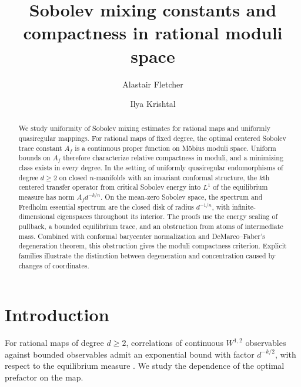 \documentclass[11pt,reqno]{amsart}
\theoremstyle{plain}
\theoremstyle{definition}
\theoremstyle{remark}
\numberwithin{equation}{section}
\begin{document}
\title{Sobolev mixing constants and compactness in rational moduli space}

\author[A. Fletcher]{Alastair Fletcher}
\address{Department of Mathematical Sciences, Northern Illinois University,
DeKalb, IL 60115, USA}

\author[I. Krishtal]{Ilya Krishtal}
\address{Department of Mathematical Sciences, Northern Illinois University,
DeKalb, IL 60115, USA}


\begin{abstract}
We study uniformity of Sobolev mixing estimates for rational maps and uniformly quasiregular mappings. For rational maps of fixed degree, the optimal centered Sobolev trace constant $A_f$ is a continuous proper function on M\"obius moduli space. Uniform bounds on $A_f$ therefore characterize relative compactness in moduli, and a minimizing class exists in every degree. In the setting of uniformly quasiregular endomorphisms of degree $d\ge2$ on closed $n$-manifolds with an invariant conformal structure, the $k$th centered transfer operator from critical Sobolev energy into $L^1$ of the equilibrium measure has norm $A_f d^{-k/n}$. On the mean-zero Sobolev space, the spectrum and Fredholm essential spectrum are the closed disk of radius $d^{-1/n}$, with infinite-dimensional eigenspaces throughout its interior. The proofs use the energy scaling of pullback, a bounded equilibrium trace, and an obstruction from atoms of intermediate mass. Combined with conformal barycenter normalization and DeMarco--Faber's degeneration theorem, this obstruction gives the moduli compactness criterion. Explicit families illustrate the distinction between degeneration and concentration caused by changes of coordinates.
\end{abstract}

\maketitle



\section{Introduction}

For rational maps of degree $d\ge2$, correlations of continuous $W^{1,2}$ observables against bounded observables admit an exponential bound with factor $d^{-k/2}$, with respect to the equilibrium measure \cite{DNS07,DS06}. We study the dependence of the optimal prefactor on the map.
\end{document}
